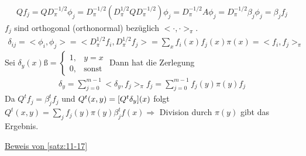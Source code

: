 \begin{beweis}
\begin{beweis}
		\begin{align}
			Qf_j = Q D^{-1/2}_{\pi} \phi_j = D^{-1/2}_\pi (D^{1/2}_\pi Q D^{-1/2}_{\pi}) \phi_j = D^{-1/2}_{\pi} A \phi_j = D^{-1/2}_{\pi} \beta_j \phi_j = \beta_j f_j
		\end{align}
		$f_j$ sind orthogonal (orthonormal) bezüglich $<\cdot,\cdot>_{\pi}$.
		\begin{align}
			\delta_{ij} = <\phi_i,\phi_j> = <D^{1/2}_{\pi} f_i, D_{\pi}^{1/2} f_j > = \sum\limits_{x} f_i(x) f_j(x) \pi(x) = <f_i,f_j>_{\pi}
		\end{align}
		Sei $\delta_y(x)ß = \begin{cases}
			1, &y = x \\
			0, &\text{sonst}
		\end{cases}$ Dann hat die Zerlegung 
		\begin{align}
			\delta_y = \sum\limits_{j = 0}^{m-1} <\delta_y,f_j>_{\pi} f_j = \sum\limits_{j = 0}^{m-1} f_j(y) \pi(y) f_j
		\end{align}
		Da $Q^t f_j = \beta^t_j f_j$ und $Q^t(x,y) = \benb{Q^t\delta_y} (x)$ folgt $Q^t(x,y) = \sum\limits_{j}f_j(y) \pi(y) \beta_j^t f(x) \Rightarrow $ Division durch $\pi(y)$ gibt das Ergebnis.
	\end{beweis}
	\underline{Beweis von \autoref{satz:11-17}}
	

\end{beweis}
